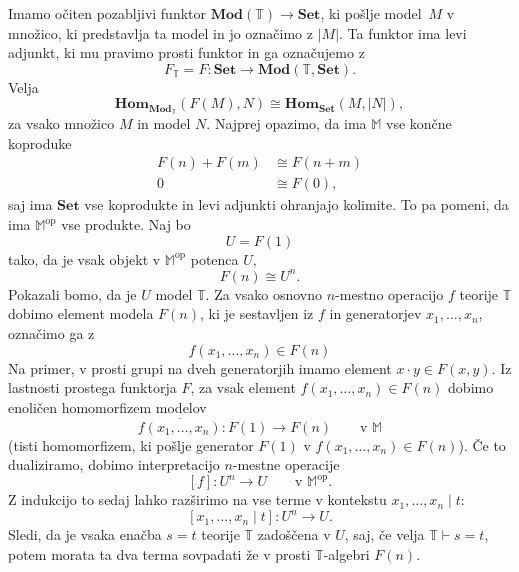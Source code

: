 \documentclass[../kategoricna_logika.tex]{subfiles}
\begin{document}
\begin{dokaz}
  Imamo očiten pozabljivi funktor
  $\mathbf{Mod}(\mathbb{T}) \to \mathbf{Set}$, ki pošlje model~$M$ v
  množico, ki predstavlja ta model in jo označimo z $|M|$.  Ta funktor
  ima levi adjunkt, ki mu pravimo prosti funktor in ga označujemo z
  \[ F_{\mathbb{T}} = F : \mathbf{Set} \to \mathbf{Mod}(\mathbb{T},
    \mathbf{Set}). \] Velja
  \[ \mathbf{Hom}_{\mathbf{Mod}_{\mathbb{T}}}(F(M), N) \cong
    \mathbf{Hom}_{\mathbf{Set}}(M, |N|),\] za vsako množico $M$ in
  model $N$.  Najprej opazimo, da ima $\mathbb{M}$ vse končne
  koproduke
  \begin{align*}
    F(n) + F(m) &\cong F(n + m) \\
    0 &\cong F(0),
  \end{align*}
  saj ima $\mathbf{Set}$ vse koprodukte in levi adjunkti ohranjajo kolimite.
  To pa pomeni, da ima $\mathbb{M}^{\mathrm{op}}$ vse produkte. Naj bo
  \[ U = F(1) \]
  tako, da je vsak objekt v $\mathbb{M}^{\mathrm{op}}$ potenca $U$,
  \[ F(n) \cong U^n.\]
  Pokazali bomo, da je $U$ model $\mathbb{T}$.
  Za vsako osnovno $n$-mestno operacijo $f$ teorije $\mathbb{T}$ dobimo element modela
  $F(n)$, ki je sestavljen iz $f$ in generatorjev $x_1, \ldots, x_n$, označimo ga z
  \[ f(x_1, \ldots, x_n) \in F(n)\]
  Na primer, v prosti grupi na dveh generatorjih imamo element $x \cdot y \in F(x,y)$.
  Iz lastnosti prostega funktorja $F$, za vsak element $f(x_1, \ldots, x_n) \in F(n)$
  dobimo enoličen homomorfizem modelov
  \[ \overline{f(x_1, \ldots, x_n)} : F(1) \to F(n) \qquad \text{v $\mathbb{M}$}\]
  (tisti homomorfizem, ki pošlje generator $F(1)$ v $f(x_1, \ldots, x_n) \in F(n)$).
  Če to dualiziramo, dobimo interpretacijo $n$-mestne operacije
  \[ [f] : U^n \to U \qquad \text{v $\mathbb{M}^{\mathrm{op}}$}.\]
  Z indukcijo to sedaj lahko razširimo na vse terme v kontekstu $x_1, \ldots, x_n \mid t$:
  \[ [x_{1}, \ldots, x_n \mid t] : U^n \to U.\]
  Sledi, da je vsaka enačba $s = t$ teorije $\mathbb{T}$ zadoščena v $U$,
  saj, če velja $\mathbb{T} \vdash s = t$, potem morata ta dva terma sovpadati
  že v prosti $\mathbb{T}$-algebri $F(n)$.


\end{dokaz}
\end{document}
